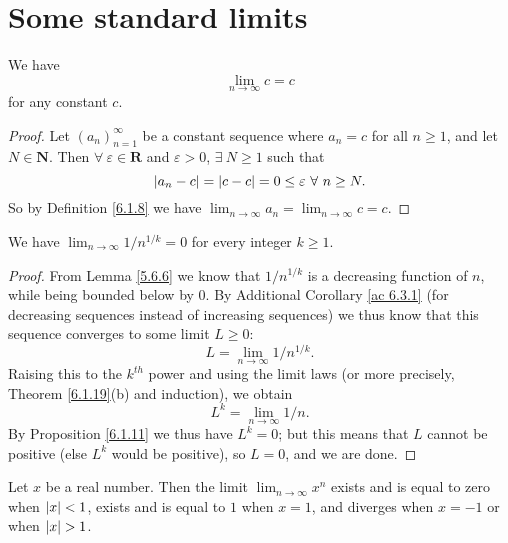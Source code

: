 \section{Some standard limits}\label{sec 6.5}

\begin{additional corollary}\label{ac 6.5.1}
We have
\[
    \lim_{n \to \infty} c = c
\]
for any constant \(c\).
\end{additional corollary}

\begin{proof}
    Let \((a_n)_{n = 1}^\infty\) be a constant sequence where \(a_n = c\) for all \(n \geq 1\), and let \(N \in \mathbf{N}\).
    Then \(\forall\ \varepsilon \in \mathbf{R}\) and \(\varepsilon > 0\), \(\exists\ N \geq 1\) such that
    \[
        \abs*{a_n - c} = \abs*{c - c} = 0 \leq \varepsilon \ \forall\ n \geq N.
    \]
    So by Definition \ref{6.1.8} we have \(\lim_{n \to \infty} a_n = \lim_{n \to \infty} c = c\).
\end{proof}

\begin{corollary}\label{6.5.1}
    We have \(\lim_{n \to \infty} 1 / n^{1 / k} = 0\) for every integer \(k \geq 1\).
\end{corollary}

\begin{proof}
    From Lemma \ref{5.6.6} we know that \(1 / n^{1 / k}\) is a decreasing function of \(n\), while being bounded below by \(0\).
    By Additional Corollary \ref{ac 6.3.1} (for decreasing sequences instead of increasing sequences) we thus know that this sequence converges to some limit \(L \geq 0\):
    \[
        L = \lim_{n \to \infty} 1 / n^{1 / k}.
    \]
    Raising this to the \(k^{th}\) power and using the limit laws (or more precisely, Theorem \ref{6.1.19}(b) and induction), we obtain
    \[
        L^k = \lim_{n \to \infty} 1 / n.
    \]
    By Proposition \ref{6.1.11} we thus have \(L^k = 0\);
    but this means that \(L\) cannot be positive (else \(L^k\) would be positive), so \(L = 0\), and we are done.
\end{proof}

\begin{lemma}\label{6.5.2}
    Let \(x\) be a real number.
    Then the limit \(\lim_{n \to \infty} x^n\) exists and is equal to zero when \(\abs*{x} < 1\), exists and is equal to \(1\) when \(x = 1\), and diverges when \(x = -1\) or when \(\abs*{x} > 1\).
\end{lemma}

